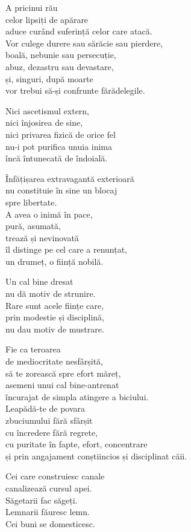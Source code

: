 A pricinui rău\\
celor lipsiți de apărare\\
aduce curând suferință celor care atacă.\\
Vor culege durere sau sărăcie sau pierdere,\\
boală, nebunie sau persecuție,\\
abuz, dezastru sau devastare,\\
și, singuri, după moarte\\
vor trebui să-și confrunte fărădelegile.


Nici ascetismul extern,\\
nici înjosirea de sine,\\
nici privarea fizică de orice fel\\
nu-i pot purifica unuia inima\\
încă întunecată de îndoială.


Înfățișarea extravagantă exterioară\\
nu constituie în sine un blocaj\\
spre libertate.\\
A avea o inimă în pace,\\
pură, asumată,\\
trează și nevinovată\\
îl distinge pe cel care a renunțat,\\
un drumeț, o ființă nobilă.


Un cal bine dresat\\
nu dă motiv de strunire.\\
Rare sunt acele ființe care,\\
prin modestie și disciplină,\\
nu dau motiv de mustrare.


Fie ca teroarea\\
de mediocritate nesfârșită,\\
să te zorească spre efort măreț,\\
asemeni unui cal bine-antrenat\\
încurajat de simpla atingere a biciului.\\
Leapădă-te de povara\\
zbuciumului fără sfârșit\\
cu încredere fără regrete,\\
cu puritate în fapte, efort, concentrare\\
și prin angajament conștiincios și disciplinat căii.


Cei care construiesc canale\\
canalizează cursul apei.\\
Săgetarii fac săgeți.\\
Lemnarii făuresc lemn.\\
Cei buni se domesticesc.
